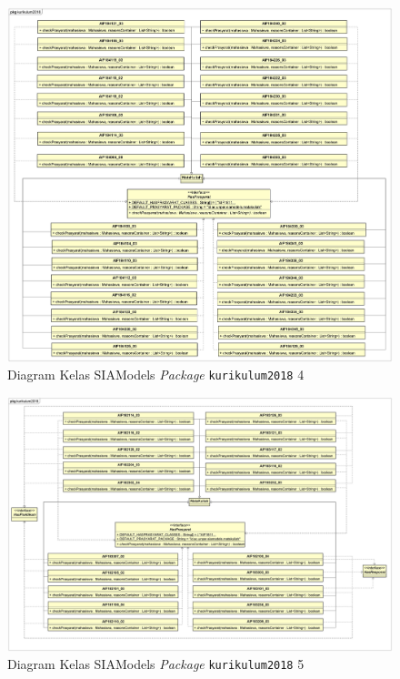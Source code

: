 \begin{figure}[H]
\centering
\includegraphics[scale=0.135]{Gambar/class-diagram-siamodels-mk-kurikulum-2018-4}
\caption{Diagram Kelas SIAModels \textit{Package} \texttt{kurikulum2018} 4}
\label{fig:siamodels_class_2018_kurikulum_4}
\end{figure}

\begin{figure}[H]
\centering
\includegraphics[scale=0.135]{Gambar/class-diagram-siamodels-mk-kurikulum-2018-5}
\caption{Diagram Kelas SIAModels \textit{Package} \texttt{kurikulum2018} 5}
\label{fig:siamodels_class_2018_kurikulum_5}
\end{figure}

